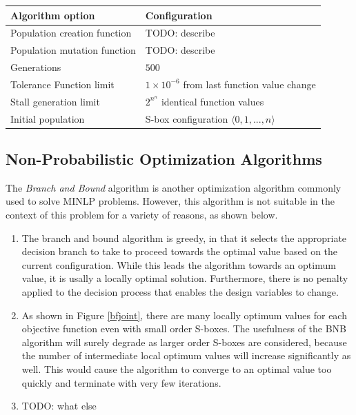 \documentclass[11pt]{article}
\begin{document}
\begin{table}
    \begin{tabular}{|l|l|}
        \hline
        \textbf{Algorithm option} & \textbf{Configuration} \\ \hline
        Population creation function & TODO: describe \\ 
        Population mutation function & TODO: describe \\ 
        Generations & $500$ \\ 
        Tolerance Function limit & $1 \times 10^{-6}$ from last function value change \\ 
        Stall generation limit & $2^{n^n}$ identical function values \\ 
        Initial population & S-box configuration $\langle 0, 1, ..., n \rangle$ \\
        \hline
    \end{tabular}
\end{table}

\subsection{Non-Probabilistic Optimization Algorithms}

The \emph{Branch and Bound} algorithm is another optimization algorithm commonly used to solve MINLP problems. However, this algorithm is not suitable in the context of this problem for a variety of reasons, as shown below.

\begin{enumerate}
	\item The branch and bound algorithm is greedy, in that it selects the appropriate decision branch to take to proceed towards the optimal value based on the current configuration. While this leads the algorithm towards an optimum value, it is usally a locally optimal solution. Furthermore, there is no penalty applied to the decision process that enables the design variables to change. 
	\item As shown in Figure \ref{bfjoint}, there are many locally optimum values for each objective function even with small order S-boxes. The usefulness of the BNB algorithm will surely degrade as larger order S-boxes are considered, because the number of intermediate local optimum values will increase significantly as well. This would cause the algorithm to converge to an optimal value too quickly and terminate with very few iterations. 
	\item TODO: what else
\end{enumerate}
\end{document}
